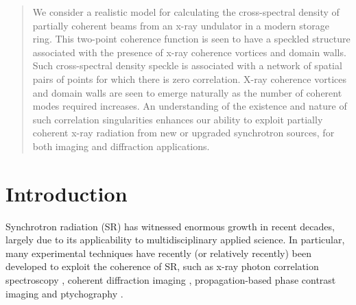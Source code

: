 \documentclass[%
 reprint,
 amsmath,amssymb,
 aps,
]{revtex4-1}
\begin{document}
\begin{abstract}
We consider a realistic model for calculating the cross-spectral density of partially coherent beams from an x-ray undulator in a modern storage ring.  This two-point coherence function is seen to have a speckled structure associated with the presence of x-ray coherence vortices and domain walls.  Such cross-spectral density speckle is associated with a network of spatial pairs of points for which there is zero correlation.  X-ray coherence vortices and domain walls are seen to emerge naturally as the number of coherent modes required increases.  An understanding of the existence and nature of such correlation singularities enhances our ability to exploit partially coherent x-ray radiation from new or upgraded synchrotron sources, for both imaging and diffraction applications.
\end{abstract}

\maketitle                        %


\section{Introduction}

Synchrotron radiation (SR) has witnessed enormous growth in recent decades, largely due to its applicability to multidisciplinary applied science. In particular, many experimental techniques have recently (or relatively recently) been developed to exploit the coherence of SR, such as x-ray photon correlation spectroscopy \cite{XPCS}, coherent diffraction imaging \cite{CDI}, propagation-based phase contrast imaging \cite{PBPCI} and ptychography \cite{Ptychography}. 
\end{document}
